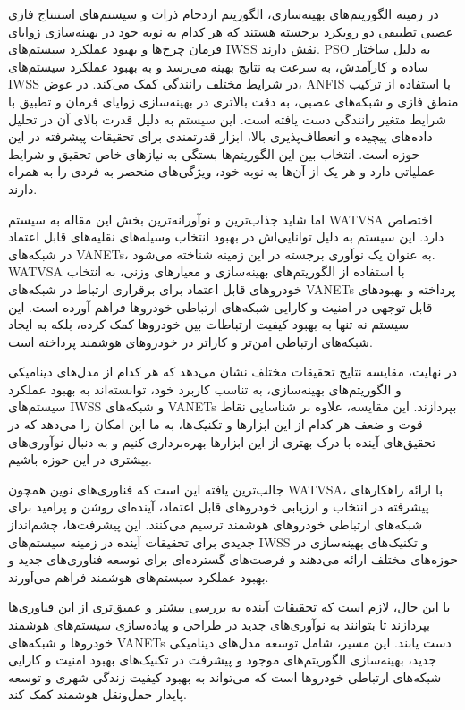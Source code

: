 \documentclass[a4paper,10pt]{article}
\begin{document}
        در زمینه الگوریتم‌های بهینه‌سازی، الگوریتم ازدحام ذرات و سیستم‌های استنتاج فازی عصبی تطبیقی دو رویکرد برجسته هستند که هر کدام به نوبه خود در بهینه‌سازی زوایای فرمان چرخ‌ها و بهبود عملکرد سیستم‌های IWSS نقش دارند. PSO به دلیل ساختار ساده و کارآمدش، به سرعت به نتایج بهینه می‌رسد و به بهبود عملکرد سیستم‌های IWSS در شرایط مختلف رانندگی کمک می‌کند. در عوض، ANFIS با استفاده از ترکیب منطق فازی و شبکه‌های عصبی، به دقت بالاتری در بهینه‌سازی زوایای فرمان و تطبیق با شرایط متغیر رانندگی دست یافته است. این سیستم به دلیل قدرت بالای آن در تحلیل داده‌های پیچیده و انعطاف‌پذیری بالا، ابزار قدرتمندی برای تحقیقات پیشرفته در این حوزه است. انتخاب بین این الگوریتم‌ها بستگی به نیازهای خاص تحقیق و شرایط عملیاتی دارد و هر یک از آن‌ها به نوبه خود، ویژگی‌های منحصر به فردی را به همراه دارند.

        اما شاید جذاب‌ترین و نوآورانه‌ترین بخش این مقاله به سیستم WATVSA اختصاص دارد. این سیستم به دلیل توانایی‌اش در بهبود انتخاب وسیله‌های نقلیه‌های قابل اعتماد در شبکه‌های VANETs، به عنوان یک نوآوری برجسته در این زمینه شناخته می‌شود. WATVSA با استفاده از الگوریتم‌های بهینه‌سازی و معیارهای وزنی، به انتخاب خودروهای قابل اعتماد برای برقراری ارتباط در شبکه‌های VANETs پرداخته و بهبودهای قابل توجهی در امنیت و کارایی شبکه‌های ارتباطی خودروها فراهم آورده است. این سیستم نه تنها به بهبود کیفیت ارتباطات بین خودروها کمک کرده، بلکه به ایجاد شبکه‌های ارتباطی امن‌تر و کاراتر در خودروهای هوشمند پرداخته است.

        در نهایت، مقایسه نتایج تحقیقات مختلف نشان می‌دهد که هر کدام از مدل‌های دینامیکی و الگوریتم‌های بهینه‌سازی، به تناسب کاربرد خود، توانسته‌اند به بهبود عملکرد سیستم‌های IWSS و شبکه‌های VANETs بپردازند. این مقایسه، علاوه بر شناسایی نقاط قوت و ضعف هر کدام از این ابزارها و تکنیک‌ها، به ما این امکان را می‌دهد که در تحقیق‌های آینده با درک بهتری از این ابزارها بهره‌برداری کنیم و به دنبال نوآوری‌های بیشتری در این حوزه باشیم.

        جالب‌ترین یافته این است که فناوری‌های نوین همچون WATVSA، با ارائه راهکارهای پیشرفته در انتخاب و ارزیابی خودروهای قابل اعتماد، آینده‌ای روشن و پرامید برای شبکه‌های ارتباطی خودروهای هوشمند ترسیم می‌کنند. این پیشرفت‌ها، چشم‌انداز جدیدی برای تحقیقات آینده در زمینه سیستم‌های IWSS و تکنیک‌های بهینه‌سازی در حوزه‌های مختلف ارائه می‌دهند و فرصت‌های گسترده‌ای برای توسعه فناوری‌های جدید و بهبود عملکرد سیستم‌های هوشمند فراهم می‌آورند.

        با این حال، لازم است که تحقیقات آینده به بررسی بیشتر و عمیق‌تری از این فناوری‌ها بپردازند تا بتوانند به نوآوری‌های جدید در طراحی و پیاده‌سازی سیستم‌های هوشمند خودروها و شبکه‌های VANETs دست یابند. این مسیر، شامل توسعه مدل‌های دینامیکی جدید، بهینه‌سازی الگوریتم‌های موجود و پیشرفت در تکنیک‌های بهبود امنیت و کارایی شبکه‌های ارتباطی خودروها است که می‌تواند به بهبود کیفیت زندگی شهری و توسعه پایدار حمل‌ونقل هوشمند کمک کند.
\end{document}
